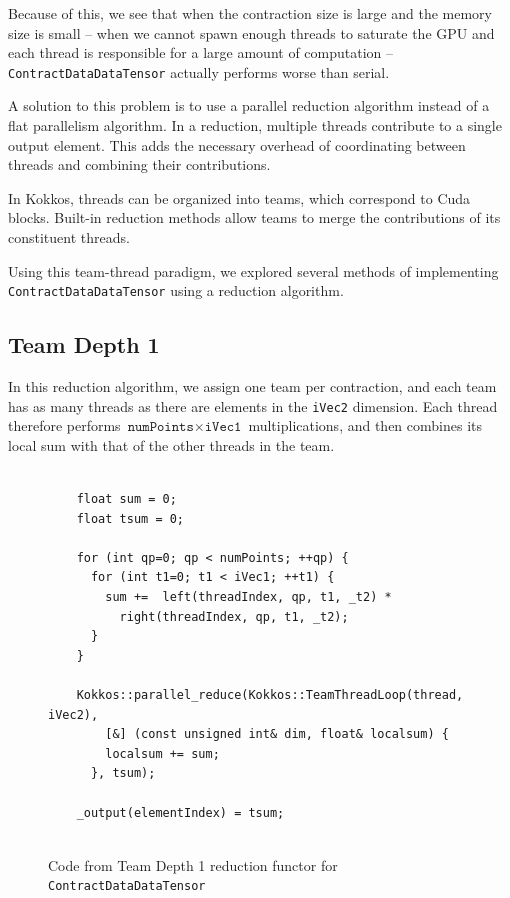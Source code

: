 Because of this, we see that when the contraction size is large and the memory size is
small -- when we cannot spawn enough threads to saturate the GPU and each thread
is responsible for a large amount of computation --
\texttt{ContractDataDataTensor} actually performs worse than serial.

A solution to this problem is to use a parallel reduction algorithm instead of a
flat parallelism algorithm.  In a reduction, multiple threads contribute to a
single output element.  This adds the necessary overhead of coordinating between
threads and combining their contributions.

In Kokkos, threads can be organized into teams, which correspond to Cuda blocks.
Built-in reduction methods allow teams to merge the contributions of its
constituent threads.

Using this team-thread paradigm, we explored several methods of implementing
\texttt{ContractDataDataTensor} using a reduction algorithm.

\subsection{Team Depth 1}
    In this reduction algorithm, we assign one team per contraction, and each
    team has as many threads as there are elements in the \texttt{iVec2}
    dimension.  Each thread therefore performs $\texttt{numPoints} \times
    \texttt{iVec1}$ multiplications, and then combines its local sum with that
    of the other threads in the team.


\begin{figure}[ht]
    \begin{lstlisting}

    float sum = 0;
    float tsum = 0;

    for (int qp=0; qp < numPoints; ++qp) {
      for (int t1=0; t1 < iVec1; ++t1) {
        sum +=  left(threadIndex, qp, t1, _t2) *
          right(threadIndex, qp, t1, _t2);
      }
    }

    Kokkos::parallel_reduce(Kokkos::TeamThreadLoop(thread, iVec2),
        [&] (const unsigned int& dim, float& localsum) {
        localsum += sum;
      }, tsum);

    _output(elementIndex) = tsum;
    
 \end{lstlisting}
\caption{Code from Team Depth 1 reduction functor for \texttt{ContractDataDataTensor}
\label{lst:ContractDataDataTensorDepth1Functor}} 
\end{figure}

